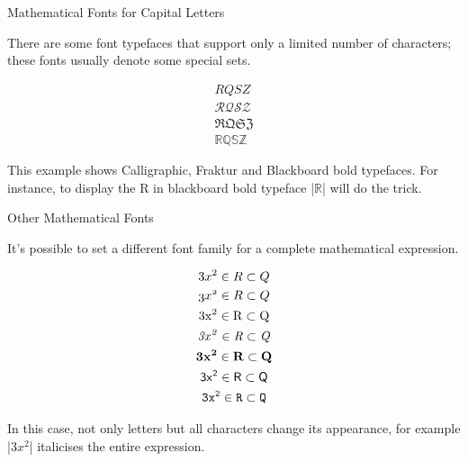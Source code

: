 \begin{frame}[fragile]{Mathematical Fonts for Capital Letters}

There are some font typefaces that support only a limited number of characters; these fonts usually denote some special sets.

\begin{latexexamplesplit}
\begin{gather*}
  RQSZ \\
  \mathcal{RQSZ} \\
  \mathfrak{RQSZ} \\
  \mathbb{RQSZ}
\end{gather*}
\end{latexexamplesplit}

This example shows Calligraphic, Fraktur and Blackboard bold typefaces. For instance, to display the R in blackboard bold typeface \LC|$\mathbb{R}$| will do the trick.

\end{frame}

\begin{frame}[fragile]{Other Mathematical Fonts}

It's possible to set a different font family for a complete mathematical expression.

\begin{latexexamplesplit}
\begin{gather*}
  3x^2 \in R \subset Q \\
  \mathnormal{3x^2 \in R \subset Q} \\
  \mathrm{3x^2 \in R \subset Q} \\
  \mathit{3x^2 \in R \subset Q} \\
  \mathbf{3x^2 \in R \subset Q} \\
  \mathsf{3x^2 \in R \subset Q} \\
  \mathtt{3x^2 \in R \subset Q} 
\end{gather*}
\end{latexexamplesplit}

In this case, not only letters but all characters change its appearance, for example \LC|$\mathit{3x^2}$| italicises the entire expression.

\end{frame}


